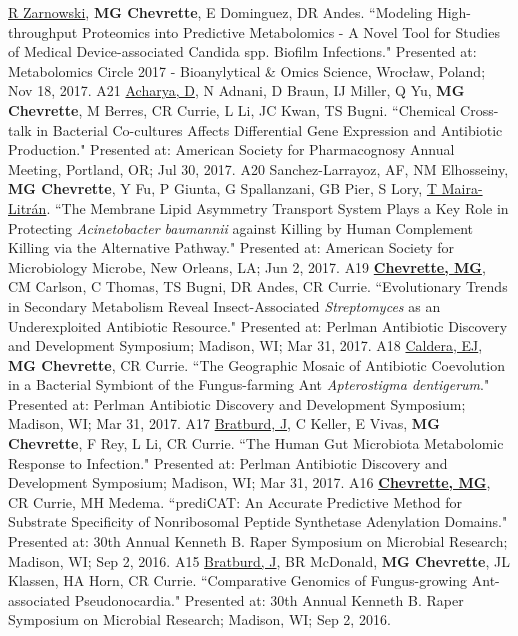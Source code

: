 \begin{cvpubs}
  \cvpub
    {\underline{R Zarnowski}, \textbf{MG Chevrette}, E Dominguez, DR Andes. ``Modeling High-throughput Proteomics into Predictive Metabolomics - A Novel Tool for Studies of Medical Device-associated Candida spp. Biofilm Infections." Presented at: Metabolomics Circle 2017 - Bioanylytical \& Omics Science, Wrocław, Poland; Nov 18, 2017.} %
    {A21} %
  \cvpub
    {\underline{Acharya, D}, N Adnani, D Braun, IJ Miller, Q Yu, \textbf{MG Chevrette}, M Berres, CR Currie, L Li, JC Kwan, TS Bugni. ``Chemical Cross-talk in Bacterial Co-cultures Affects Differential Gene Expression and Antibiotic Production." Presented at: American Society for Pharmacognosy Annual Meeting, Portland, OR; Jul 30, 2017.} %
    {A20} %
  \cvpub
    {Sanchez-Larrayoz, AF, NM Elhosseiny, \textbf{MG Chevrette}, Y Fu, P Giunta, G Spallanzani, GB Pier, S Lory, \underline{T Maira-Litr\'{a}n}. ``The Membrane Lipid Asymmetry Transport System Plays a Key Role in Protecting \textit{Acinetobacter baumannii} against Killing by Human Complement Killing via the Alternative Pathway." Presented at: American Society for Microbiology Microbe, New Orleans, LA; Jun 2, 2017.} %
    {A19} %
  \cvpub
    {\underline{\textbf{Chevrette, MG}}, CM Carlson, C Thomas, TS Bugni, DR Andes, CR Currie. ``Evolutionary Trends in Secondary Metabolism Reveal Insect-Associated \textit{Streptomyces} as an Underexploited Antibiotic Resource." Presented at: Perlman Antibiotic Discovery and Development Symposium; Madison, WI; Mar 31, 2017.} %
    {A18} %
  \cvpub
    {\underline{Caldera, EJ}, \textbf{MG Chevrette}, CR Currie. ``The Geographic Mosaic of Antibiotic Coevolution in a Bacterial Symbiont of the Fungus-farming Ant \textit{Apterostigma dentigerum}." Presented at: Perlman Antibiotic Discovery and Development Symposium; Madison, WI; Mar 31, 2017.} %
    {A17} %
  \cvpub
    {\underline{Bratburd, J}, C Keller, E Vivas, \textbf{MG Chevrette}, F Rey, L Li, CR Currie. ``The Human Gut Microbiota Metabolomic Response to Infection." Presented at: Perlman Antibiotic Discovery and Development Symposium; Madison, WI; Mar 31, 2017.} %
    {A16} %
  \cvpub
    {\textbf{\underline{Chevrette, MG}}, CR Currie, MH Medema.  ``prediCAT: An Accurate Predictive Method for Substrate Specificity of Nonribosomal Peptide Synthetase Adenylation Domains." Presented at: 30th Annual Kenneth B. Raper Symposium on Microbial Research; Madison, WI; Sep 2, 2016.} %
    {A15} %
  \cvpub
    {\underline{Bratburd, J}, BR McDonald, \textbf{MG Chevrette}, JL Klassen, HA Horn, CR Currie. ``Comparative Genomics of Fungus-growing Ant-associated Pseudonocardia." Presented at: 30th Annual Kenneth B. Raper Symposium on Microbial Research; Madison, WI; Sep 2, 2016.} %

\end{cvpubs}
